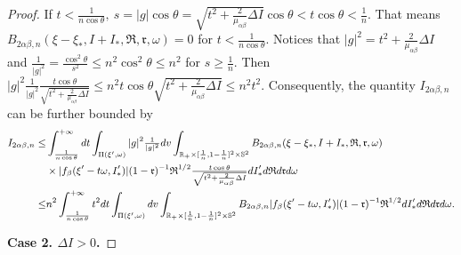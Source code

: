 \documentclass[reqno,11pt]{amsart}
\numberwithin{equation}{section}
\def\R{\mathbb{R}}
\begin{document}
\begin{proof}
 If $t < \tfrac{1}{n \cos\theta },\ s = |g| \cos\theta = \sqrt{t^2+\tfrac{2}{\mu_{\alpha \beta }}\Delta I } \cos \theta < t \cos \theta <\frac{1}{n}$. That means $B_{2\alpha \beta ,n} (\xi-\xi_*,I+I_*,\mathfrak{R},\mathfrak{r},\omega ) =0$ for $t < \tfrac{1}{n \cos \theta }$. Notices that $|g|^2 = t^2+\frac{2}{\mu_{\alpha \beta }}\Delta I $ and $\tfrac{1}{|g|^2} = \tfrac{\cos^2 \theta}{s^2} \leq n^2 \cos^2 \theta \leq n^2$ for $s \geq \tfrac{1}{n}$. Then $ |g|^2 \tfrac{1}{|g|^2} \frac{t \cos \theta }{\sqrt{t^2+\frac{2}{\mu_{\alpha \beta }}\Delta I }} \leq n^2 t \cos \theta \sqrt{t^2+\frac{2}{\mu_{\alpha \beta }}\Delta I } \leq n^2 t^2 $. Consequently, the quantity $I_{2 \alpha \beta, n}$ can be further bounded by
\begin{equation*}{\small
\begin{aligned}
I_{2 \alpha \beta, n} \leq & \int_{\frac{1}{n \cos \theta} }^{+\infty} dt \int_{\Pi (\xi' ,\omega )} |g|^2 \tfrac{1}{|g|^2} dv \int_{\R_+ \times [\frac{1}{n},1-\frac{1}{n} ]^2 \times \mathbb{S}^2 } B_{2\alpha \beta ,n} (\xi-\xi_*,I+I_*,\mathfrak{R},\mathfrak{r},\omega )\\
& \times | f_{\beta }(\xi'-t\omega ,I'_*) | (1-\mathfrak{r})^{-1} \mathfrak{R}^{1/2} \tfrac{t \cos \theta }{\sqrt{t^2+\frac{2}{\mu_{\alpha \beta }}\Delta I }} d I'_* d \mathfrak{R} d \mathfrak{r} d \omega \\
\leq & n^2 \int_{\frac{1}{n \cos\theta} }^{+\infty}t^2 dt \int_{\Pi (\xi' ,\omega )}  dv \int_{\R_+ \times [\frac{1}{n},1-\frac{1}{n}]^2 \times \mathbb{S}^2 } B_{2\alpha \beta ,n} | f_{\beta }(\xi'-t\omega ,I'_*) | (1-\mathfrak{r})^{-1} \mathfrak{R}^{1/2} dI'_* d \mathfrak{R} d \mathfrak{r} d\omega.
\end{aligned}}
\end{equation*}

{\bf Case 2. $\Delta I > 0$.}


\end{proof}
\end{document}

